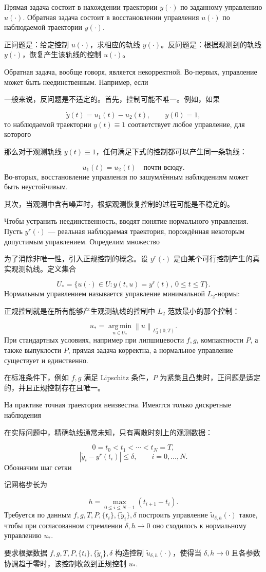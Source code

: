 \documentclass[12pt,a4paper]{article}
\newcommand{\norm}[1]{\left\lVert #1\right\rVert}
\newcommand{\zh}[1]{\par\noindent #1\par}
\begin{document}
Прямая задача состоит в нахождении траектории $y(\cdot)$ по заданному управлению $u(\cdot)$. Обратная задача состоит в восстановлении управления $u(\cdot)$ по наблюдаемой траектории $y(\cdot)$.
\zh{正问题是：给定控制 $u(\cdot)$，求相应的轨线 $y(\cdot)$。反问题是：根据观测到的轨线 $y(\cdot)$，恢复产生该轨线的控制 $u(\cdot)$。}

Обратная задача, вообще говоря, является некорректной. Во-первых, управление может быть неединственным. Например, если
\zh{一般来说，反问题是不适定的。首先，控制可能不唯一。例如，如果}
\[
    \dot y(t)=u_1(t)-u_2(t),\qquad y(0)=1,
\]
то наблюдаемой траектории $y(t)\equiv 1$ соответствует любое управление, для которого
\zh{那么对于观测轨线 $y(t)\equiv 1$，任何满足下式的控制都可以产生同一条轨线：}
\[
    u_1(t)=u_2(t)\quad \text{почти всюду}.
\]
Во-вторых, восстановление управления по зашумлённым наблюдениям может быть неустойчивым.
\zh{其次，当观测中含有噪声时，根据观测恢复控制的过程可能是不稳定的。}

Чтобы устранить неединственность, вводят понятие нормального управления. Пусть $y^r(\cdot)$ --- реальная наблюдаемая траектория, порождённая некоторым допустимым управлением. Определим множество
\zh{为了消除非唯一性，引入正规控制的概念。设 $y^r(\cdot)$ 是由某个可行控制产生的真实观测轨线。定义集合}
\begin{equation}
    U_* = \{u(\cdot)\in U: y(t,u)=y^r(t),\ 0\le t\le T\}.
\end{equation}
Нормальным управлением называется управление минимальной $L_2$-нормы:
\zh{正规控制就是在所有能够产生观测轨线的控制中 $L_2$ 范数最小的那个控制：}
\begin{equation}
    u_* = \operatorname*{arg\,min}_{u\in U_*}\norm{u}_{L_2^r(0,T)}.
\end{equation}
При стандартных условиях, например при липшицевости $f,g$, компактности $P$, а также выпуклости $P$, прямая задача корректна, а нормальное управление существует и единственно.
\zh{在标准条件下，例如 $f,g$ 满足 Lipschitz 条件，$P$ 为紧集且凸集时，正问题是适定的，并且正规控制存在且唯一。}


На практике точная траектория неизвестна. Имеются только дискретные наблюдения
\zh{在实际问题中，精确轨线通常未知，只有离散时刻上的观测数据：}
\[
    0=t_0<t_1<\cdots<t_N=T,
\]
\begin{equation}
    |\tilde y_i-y^r(t_i)|\le \delta,
    \qquad i=0,\ldots,N.
\end{equation}
Обозначим шаг сетки
\zh{记网格步长为}
\begin{equation}
    h=\max_{0\le i\le N-1}(t_{i+1}-t_i).
\end{equation}
Требуется по данным $f,g,T,P,\{t_i\},\{\tilde y_i\},\delta$ построить управление $\tilde u_{\delta,h}(\cdot)$ такое, чтобы при согласованном стремлении $\delta,h\to0$ оно сходилось к нормальному управлению $u_*$. 
\zh{要求根据数据 $f,g,T,P,\{t_i\},\{\tilde y_i\},\delta$ 构造控制 $\tilde u_{\delta,h}(\cdot)$，使得当 $\delta,h\to0$ 且各参数协调趋于零时，该控制收敛到正规控制 $u_*$.}
\end{document}
